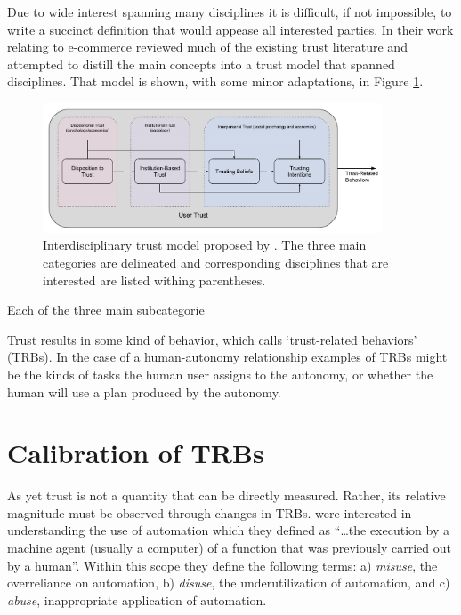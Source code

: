     Due to wide interest spanning many disciplines it is difficult, if not impossible, to write a succinct definition that would appease all interested parties. In their work relating to e-commerce \citet{McKnight2001-fa} reviewed much of the existing trust literature and attempted to distill the main concepts into a trust model that spanned disciplines. That model is shown, with some minor adaptations, in Figure \ref{fig:UserTrust}.

	\begin{figure}[htbp]
    	\centering
     	\includegraphics[width=0.9\textwidth]{Figures/UserTrust}
    	\caption{Interdisciplinary trust model proposed by \citet{McKnight2001-fa}. The three main categories are delineated and corresponding disciplines that are interested are listed withing parentheses. }
        \label{fig:UserTrust}
    \end{figure}

    Each of the three main subcategorie

    Trust results in some kind of behavior, which \citet{McKnight2001-fa} calls `trust-related behaviors' (TRBs). In the case of a human-autonomy relationship examples of TRBs might be the kinds of tasks the human user assigns to the autonomy, or whether the human will use a plan produced by the autonomy.

\section{Calibration of TRBs}
    As yet trust is not a quantity that can be directly measured. Rather, its relative magnitude must be observed through changes in TRBs. \citet{Parasuraman1997-co} were interested in understanding the use of automation which they defined as ``\ldots the execution by a machine agent (usually a computer) of a function that was previously carried out by a human''. Within this scope they define the following terms: a) \emph{misuse}, the overreliance on automation, b) \emph{disuse}, the underutilization of automation, and c) \emph{abuse}, inappropriate application of automation.

